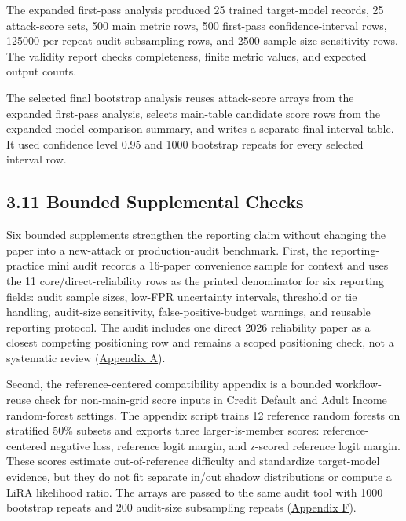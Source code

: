 \documentclass[
  10pt,
  twocolumn]{article}
\begin{document}
The expanded first-pass analysis produced 25 trained target-model records, 25 attack-score sets, 500 main metric rows, 500 first-pass confidence-interval rows, 125000 per-repeat audit-subsampling rows, and 2500 sample-size sensitivity rows. The validity report checks completeness, finite metric values, and expected output counts.

The selected final bootstrap analysis reuses attack-score arrays from the expanded first-pass analysis, selects main-table candidate score rows from the expanded model-comparison summary, and writes a separate final-interval table. It used confidence level 0.95 and 1000 bootstrap repeats for every selected interval row.

\hypertarget{bounded-supplemental-checks}{%
\subsection{3.11 Bounded Supplemental Checks}\label{bounded-supplemental-checks}}

Six bounded supplements strengthen the reporting claim without changing the paper into a new-attack or production-audit benchmark. First, the reporting-practice mini audit records a 16-paper convenience sample for context and uses the 11 core/direct-reliability rows as the printed denominator for six reporting fields: audit sample sizes, low-FPR uncertainty intervals, threshold or tie handling, audit-size sensitivity, false-positive-budget warnings, and reusable reporting protocol. The audit includes one direct 2026 reliability paper as a closest competing positioning row and remains a scoped positioning check, not a systematic review (\protect\hyperlink{appendix-a-reporting-practice-mini-audit}{Appendix A}).

Second, the reference-centered compatibility appendix is a bounded workflow-reuse check for non-main-grid score inputs in Credit Default and Adult Income random-forest settings. The appendix script trains 12 reference random forests on stratified 50\% subsets and exports three larger-is-member scores: reference-centered negative loss, reference logit margin, and z-scored reference logit margin. These scores estimate out-of-reference difficulty and standardize target-model evidence, but they do not fit separate in/out shadow distributions or compute a LiRA likelihood ratio. The arrays are passed to the same audit tool with 1000 bootstrap repeats and 200 audit-size subsampling repeats (\protect\hyperlink{appendix-f-reference-centered-score-check}{Appendix F}).
\end{document}

